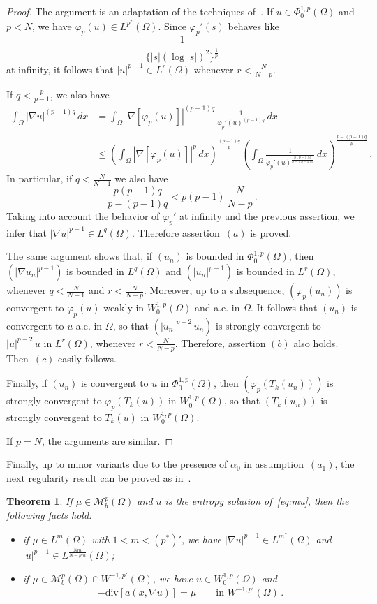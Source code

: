 \documentclass[twoside,reqno]{amsart}
\numberwithin{equation}{section}
\newtheorem{thm}{Theorem}[section]
\theoremstyle{definition}
\begin{document}
%
\begin{proof}
The argument is an adaptation of the techniques 
of~\cite{boccardo_gallouet1989, boccardo_gallouet1992, orsina1993}.
If $u\in \Phi^{1,p}_0(\Omega)$ and $p<N$, we have 
$\varphi_p(u)\in L^{p^*}(\Omega)$.
Since $\varphi_p'(s)$ behaves like
\[
\frac{1}{\{|s|(\log |s|)^2\}^{\frac{1}{p}}}
\]
at infinity, it follows that $|u|^{p-1} \in L^r(\Omega)$ 
whenever $r<\frac{N}{N-p}$.
\par
If $q<\frac{p}{p-1}$, we also have
\[
\begin{split}
\int_\Omega |\nabla u|^{(p-1)q}\,dx &=
\int_\Omega |\nabla [\varphi_p(u)]|^{(p-1)q}\,
\frac{1}{\varphi_p'(u)^{(p-1)q}}\,dx \\
&\leq
\left(\int_\Omega |\nabla [\varphi_p(u)]|^p\,dx
\right)^{\frac{(p-1)q}{p}}
\left(\int_\Omega 
\frac{1}{\varphi_p'(u)^{\frac{p(p-1)q}{p-(p-1)q}}}\,dx
\right)^{\frac{p-(p-1)q}{p}}\,.
\end{split}
\]
In particular, if $q<\frac{N}{N-1}$ we also have
\[
\frac{p(p-1)q}{p-(p-1)q} < p(p-1)\,\frac{N}{N-p}\,.
\]
Taking into account the behavior of $\varphi_p'$ 
at infinity and the previous assertion, we infer that 
$|\nabla u|^{p-1}\in L^q(\Omega)$.
Therefore assertion~$(a)$ is proved.
\par
The same argument shows that,
if $(u_n)$ is bounded in $\Phi^{1,p}_0(\Omega)$, then
$(|\nabla u_n|^{p-1})$ is bounded in $L^q(\Omega)$
and $(|u_n|^{p-1})$ is bounded in $L^r(\Omega)$,
whenever $q<\frac{N}{N-1}$ and $r<\frac{N}{N-p}$.
Moreover, up to a subsequence, $(\varphi_p(u_n))$
is convergent to $\varphi_p(u)$ weakly in $W^{1,p}_0(\Omega)$
and a.e. in $\Omega$.
It follows that $(u_n)$ is convergent to $u$ a.e. in $\Omega$,
so that 
$(|u_n|^{p-2}\,u_n)$ is strongly convergent to $|u|^{p-2}\,u$ 
in $L^r(\Omega)$, whenever $r<\frac{N}{N-p}$.
Therefore, assertion $(b)$ also holds.
Then~$(c)$ easily follows.
\par
Finally, if $(u_n)$ is convergent to $u$ in 
$\Phi^{1,p}_0(\Omega)$, then 
$(\varphi_p(T_k(u_n)))$ is strongly convergent to 
$\varphi_p(T_k(u))$ in $W^{1,p}_0(\Omega)$,
so that $(T_k(u_n))$ is strongly convergent to 
$T_k(u)$ in $W^{1,p}_0(\Omega)$.
\par
If $p=N$, the arguments are similar.
\end{proof}
%
Finally, up to minor variants due to the presence of $\alpha_0$
in assumption~$(a_1)$, the next regularity result can
be proved as
in~\cite{boccardo_gallouet1989, boccardo_gallouet1992, orsina1993}.
%
\begin{thm}
\label{thm:reglp}
If $\mu\in \mathcal{M}_b^p(\Omega)$ and $u$ is the entropy 
solution of~\eqref{eq:mu}, then the following facts hold:
\begin{itemize}
\item[$(a)$]
if $\mu\in L^m(\Omega)$ with $1<m<(p^*)'$, we have
$|\nabla u|^{p-1}\in L^{m^*}(\Omega)$ and 
$|u|^{p-1}\in L^{\frac{Nm}{N-pm}}(\Omega)$;
\item[$(b)$]
if $\mu\in \mathcal{M}_b^p(\Omega)\cap W^{-1,p'}(\Omega)$, 
we have $u\in W^{1,p}_0(\Omega)$ and 
\[
- \mathrm{div}[a(x,\nabla u)] = \mu
\qquad\text{in $W^{-1,p'}(\Omega)$}\,.
\]
\end{itemize}
\end{thm}
%
\end{document}
